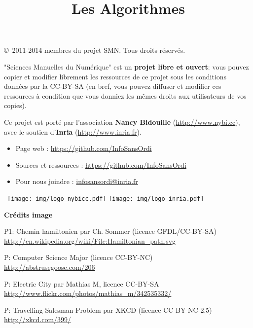 \documentclass[a5paper,pagesize,DIV=14]{scrbook}
\title{Les Algorithmes}
\date{}
\begin{document}



\copyright\ 2011-2014 membres du projet SMN. Tous droits réservés.
  
"Sciences Manuelles du Numérique" est un \textbf{projet libre et ouvert}: vous
pouvez copier et modifier librement les ressources de ce projet sous les
conditions données par la CC-BY-SA (en bref, vous pouvez diffuser et modifier
ces ressources à condition que vous donniez les mêmes droits aux utilisateurs de
vos copies).

\bigskip

Ce projet est porté par l'association \textbf{Nancy Bidouille}
(\url{http://www.nybi.cc}), avec le soutien d'\textbf{Inria}
(\url{http://www.inria.fr}).
  
\bigskip

\begin{itemize}
\item Page web : \url{https://github.com/InfoSansOrdi}
\item Sources et ressources : \url{https://github.com/InfoSansOrdi}
\item Pour nous joindre : \url{infosansordi@inria.fr}
\end{itemize}

\bigskip
~\hfill\texttt{[image: img/logo\_nybicc.pdf]}\hfill
\texttt{[image: img/logo\_inria.pdf]}\hfill~

\vfill
\textbf{Crédits image}

{\footnotesize

P1: Chemin hamiltonien par Ch. Sommer (licence GFDL/CC-BY-SA)\\
\url{http://en.wikipedia.org/wiki/File:Hamiltonian_path.svg}

P\pageref{img:CSmajor}: Computer Science Major (licence CC-BY-NC)\\
\url{http://abstrusegoose.com/206}


P\pageref{img:electric:city}: Electric City par Mathias M, licence CC-BY-SA
\url{http://www.flickr.com/photos/mathias_m/342535332/}
  
P\pageref{img:tsp_xkcd}: Travelling Salesman Problem par XKCD (licence CC BY-NC 2.5)\\
\url{http://xkcd.com/399/}
}
\end{document}
